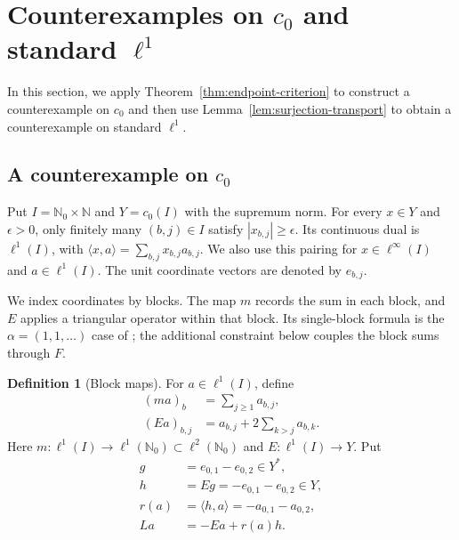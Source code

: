 \documentclass[11pt]{article}
\newcommand{\N}{\mathbb N}
\newcommand{\Nzero}{\mathbb N_0}
\newcommand{\pair}[2]{\langle #1,#2\rangle}
\theoremstyle{definition}
\newtheorem{definition}{Definition}
\theoremstyle{remark}
\begin{document}
\section{Counterexamples on $c_0$ and standard $\ell^1$}
\label{sec:counterexamples}
In this section, we apply Theorem~\ref{thm:endpoint-criterion} to construct a counterexample on $c_0$ and then use Lemma~\ref{lem:surjection-transport} to obtain a counterexample on standard $\ell^1$.



\subsection{A counterexample on $c_0$}

Put $I=\Nzero\times\N$ and $Y=c_0(I)$ with the supremum norm. For every $x\in Y$ and $\epsilon>0$, only finitely many $(b,j)\in I$ satisfy $|x_{b,j}|\ge\epsilon$. Its continuous dual is $\ell^1(I)$, with $\pair{x}{a}=\sum_{b,j}x_{b,j}a_{b,j}$. We also use this pairing for $x\in\ell^\infty(I)$ and $a\in\ell^1(I)$. The unit coordinate vectors are denoted by $e_{b,j}$.

We index coordinates by blocks. The map $m$ records the sum in each block, and $E$ applies a triangular operator within that block. Its single-block formula is the $\alpha=(1,1,\ldots)$ case of \cite[author version, Example~4.1]{bauschkeetal2011}; the additional constraint below couples the block sums through $F$.
\begin{definition}[Block maps]
For $a\in\ell^1(I)$, define
\begin{equation}
\begin{aligned}
(ma)_b&=\sum_{j\ge1}a_{b,j},\\
(Ea)_{b,j}&=a_{b,j}+2\sum_{k>j}a_{b,k}.
\end{aligned}
\label{eq:D4}
\end{equation}
Here $m:\ell^1(I)\to\ell^1(\Nzero)\subset\ell^2(\Nzero)$ and $E:\ell^1(I)\to Y$. Put
\begin{equation}
\begin{aligned}
g&=e_{0,1}-e_{0,2}\in Y^*,\\
h&=Eg=-e_{0,1}-e_{0,2}\in Y,\\
r(a)&=\pair{h}{a}=-a_{0,1}-a_{0,2},\\
La&=-Ea+r(a)h.
\end{aligned}
\label{eq:D5}
\end{equation}
\end{definition}
\end{document}
